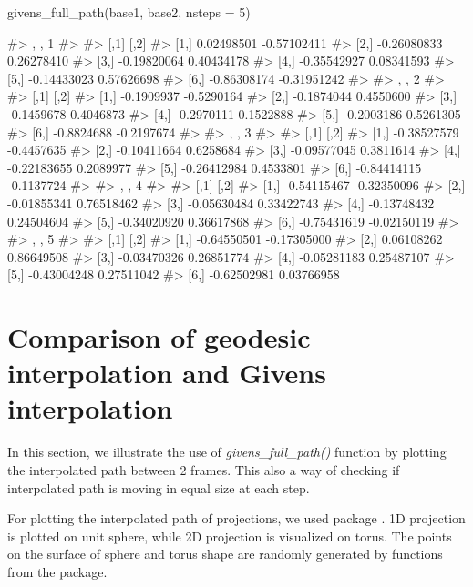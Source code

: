 \begin{Schunk}
\begin{Sinput}
givens_full_path(base1, base2, nsteps = 5)
\end{Sinput}
\begin{Soutput}
#> , , 1
#> 
#>             [,1]        [,2]
#> [1,]  0.02498501 -0.57102411
#> [2,] -0.26080833  0.26278410
#> [3,] -0.19820064  0.40434178
#> [4,] -0.35542927  0.08341593
#> [5,] -0.14433023  0.57626698
#> [6,] -0.86308174 -0.31951242
#> 
#> , , 2
#> 
#>            [,1]       [,2]
#> [1,] -0.1909937 -0.5290164
#> [2,] -0.1874044  0.4550600
#> [3,] -0.1459678  0.4046873
#> [4,] -0.2970111  0.1522888
#> [5,] -0.2003186  0.5261305
#> [6,] -0.8824688 -0.2197674
#> 
#> , , 3
#> 
#>             [,1]       [,2]
#> [1,] -0.38527579 -0.4457635
#> [2,] -0.10411664  0.6258684
#> [3,] -0.09577045  0.3811614
#> [4,] -0.22183655  0.2089977
#> [5,] -0.26412984  0.4533801
#> [6,] -0.84414115 -0.1137724
#> 
#> , , 4
#> 
#>             [,1]        [,2]
#> [1,] -0.54115467 -0.32350096
#> [2,] -0.01855341  0.76518462
#> [3,] -0.05630484  0.33422743
#> [4,] -0.13748432  0.24504604
#> [5,] -0.34020920  0.36617868
#> [6,] -0.75431619 -0.02150119
#> 
#> , , 5
#> 
#>             [,1]        [,2]
#> [1,] -0.64550501 -0.17305000
#> [2,]  0.06108262  0.86649508
#> [3,] -0.03470326  0.26851774
#> [4,] -0.05281183  0.25487107
#> [5,] -0.43004248  0.27511042
#> [6,] -0.62502981  0.03766958
\end{Soutput}
\end{Schunk}

\hypertarget{comparison-of-geodesic-interpolation-and-givens-interpolation}{%
\section{Comparison of geodesic interpolation and Givens
interpolation}\label{comparison-of-geodesic-interpolation-and-givens-interpolation}}

In this section, we illustrate the use of \emph{givens\_full\_path()}
function by plotting the interpolated path between 2 frames. This also a
way of checking if interpolated path is moving in equal size at each
step.

For plotting the interpolated path of projections, we used
 package \citep{geozoo}. 1D projection is plotted on
unit sphere, while 2D projection is visualized on torus. The points on
the surface of sphere and torus shape are randomly generated by
functions from the  package.

